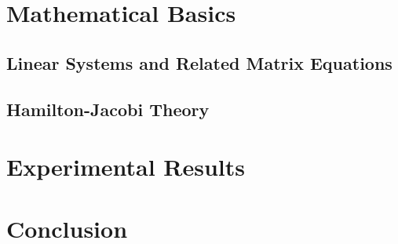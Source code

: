 \documentclass[
  bibliography=totoc,
  listof=totoc,
  oneside,
]{scrbook}
\begin{document}
\frontmatter



\cleardoublepage
{}
\tableofcontents
\listoffigures

\cleardoublepage
{}
\listoftheorems

\listoftodos
\todototoc

\mainmatter


\chapter{Mathematical Basics}
\section{Linear Systems and Related Matrix Equations}
\section{Hamilton-Jacobi Theory}






\chapter{Experimental Results}
\chapter{Conclusion}

\appendix





\backmatter
\glsaddallunused
\printglossaries
\printbibliography
\end{document}
